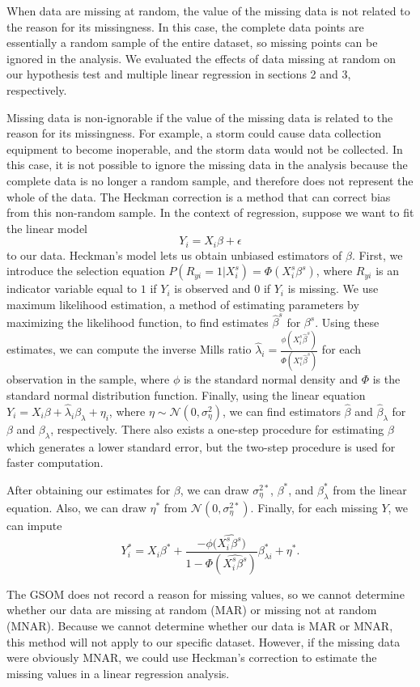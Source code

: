 When data are missing at random, the value of the missing data is not related to the reason for its missingness. In this case, the complete data points are essentially a random sample of the entire dataset, so missing points can be ignored in the analysis. We evaluated the effects of data missing at random on our hypothesis test and multiple linear regression in sections 2 and 3, respectively.

Missing data is non-ignorable if the value of the missing data is related to the reason for its missingness. For example, a storm could cause data collection equipment to become inoperable, and the storm data would not be collected. In this case, it is not possible to ignore the missing data in the analysis because the complete data is no longer a random sample, and therefore does not represent the whole of the data. The Heckman correction is a method that can correct bias from this non-random sample\cite{mnar}. In the context of regression, suppose we want to fit the linear model $$Y_{i} = X_{i}\beta+\epsilon$$ to our data. Heckman's model lets us obtain unbiased estimators of $\beta$. First, we introduce the selection equation $P(R_{yi} = 1 | X_{i}^{s}) = \Phi(X_{i}^{s}\beta^{s})$, where $R_{yi}$ is an indicator variable equal to $1$ if $Y_{i}$ is observed and $0$ if $Y_{i}$ is missing. We use maximum likelihood estimation, a method of estimating parameters by maximizing the likelihood function, to find estimates $\hat{\beta}^{s}$ for $\beta^{s}$. Using these estimates, we can compute the inverse Mills ratio $\hat{\lambda}_{i} = \frac{\phi(X_{i}^{s}\hat{\beta}^{s})}{\Phi(X_{i}^{s}\hat{\beta}^{s})}$ for each observation in the sample, where $\phi$ is the standard normal density and $\Phi$ is the standard normal distribution function. Finally, using the linear equation $Y_{i} = X_{i}\beta + \hat{\lambda}_{i}\beta_{\lambda} + \eta_{i}$, where $\eta \sim \mathcal{N}(0,\sigma_{\eta}^{2})$, we can find estimators $\hat{\beta}$ and $\hat{\beta}_{\lambda}$ for $\beta$ and $\beta_{\lambda}$, respectively. There also exists a one-step procedure for estimating $\beta$ which generates a lower standard error, but the two-step procedure is used for faster computation.

After obtaining our estimates for $\beta$, we can draw $\sigma_{\eta}^{2*}$, $\beta^{*}$, and $\beta_{\lambda}^{*}$ from the linear equation. Also, we can draw $\eta^{*}$ from $\mathcal{N}(0,\sigma_{\eta}^{2*})$. Finally, for each missing $Y$, we can impute $$Y_{i}^{*} = X_{i}\beta^{*} + \frac{-\phi(\widehat{X_{i}^{s}\beta^{s})}}{1-\Phi(\widehat{X_{i}^{s}\beta^{s}})}\beta_{\lambda i}^{*}+\eta^{*}.$$

The GSOM does not record a reason for missing values, so we cannot determine whether our data are missing at random (MAR) or missing not at random (MNAR). Because we cannot determine whether our data is MAR or MNAR, this method will not apply to our specific dataset. However, if the missing data were obviously MNAR, we could use Heckman's correction to estimate the missing values in a linear regression analysis.